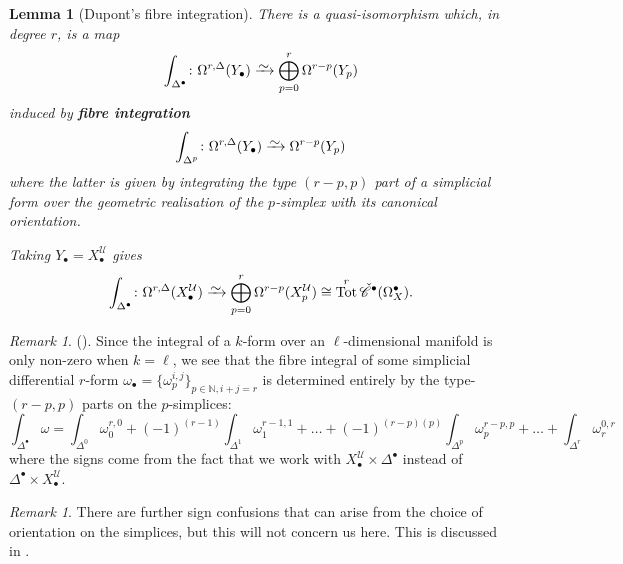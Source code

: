 \documentclass[11pt,fleqn]{article}
\theoremstyle{plain}
\newtheorem{lemma}[theorem]{Lemma}
\theoremstyle{definition}
\theoremstyle{remark}
\newtheorem{remark}[theorem]{Remark}
\numberwithin{equation}{theorem}
\newcommand{\cover}{\mathcal{U}}
\newcommand{\congto}{\xrightarrow{\raisebox{-.5ex}[0ex][0ex]{$\sim$}}}
\newcommand{\cech}{\check{\mathscr{C}}}
\newcommand{\define}[1]{\textbf{#1}}
\newcommand{\nerve}[1]{X_{#1}^\cover}
\DeclareMathOperator{\Tot}{Tot}
\begin{document}
        \begin{lemma}[Dupont's fibre integration]\label{lemma:dupont's-fibre-integration}
            There is a quasi-isomorphism which, in degree $r$, is a map
            \begin{equation}
                \int_{\Delta^\bullet}\colon \Omega^{r,\Delta}(Y_\bullet)
                \congto
                \bigoplus_{p=0}^r\Omega^{r-p}(Y_p)
            \end{equation}
            induced by \define{fibre integration}
            \begin{equation}
                \int_{\Delta^p}\colon\Omega^{r,\Delta}(Y_\bullet)
                \congto
                \Omega^{r-p}(Y_p)
            \end{equation}
            where the latter is given by integrating the type $(r-p,p)$ part of a simplicial form over the geometric realisation of the $p$-simplex with its canonical orientation.

            Taking $Y_\bullet=\nerve{\bullet}$ gives
            \[
                \int_{\Delta^\bullet}\colon \Omega^{r,\Delta}(\nerve{\bullet})
                \congto
                \bigoplus_{p=0}^r\Omega^{r-p}(\nerve{p})
                \cong
                \Tot^r\cech^\bullet(\Omega^\bullet_X).
            \]
        \end{lemma}

        \begin{remark}\label{remark:fibre-integration-only-depends-on-certain-parts}
            (\cite[p.~36]{Green1980}).
            Since the integral of a $k$-form over an $\ell$-dimensional manifold is only non-zero when $k=\ell$, we see that the fibre integral of some simplicial differential $r$-form $\omega_\bullet = \{\omega_p^{i,j}\}_{p\in\mathbb{N},i+j=r}$ is determined entirely by the type-$(r-p,p)$ parts on the $p$-simplices:
            \begin{equation*}
                \int_{\Delta^\bullet}\omega = \int_{\Delta^0}\omega_0^{r,0} + (-1)^{(r-1)}\int_{\Delta^1}\omega_1^{r-1,1} + \ldots + (-1)^{(r-p)(p)}\int_{\Delta^p}\omega_p^{r-p,p} + \ldots + \int_{\Delta^r}\omega_r^{0,r}
            \end{equation*}
            where the signs come from the fact that we work with $\nerve{\bullet}\times\Delta^\bullet$ instead of $\Delta^\bullet\times\nerve{\bullet}$.
        \end{remark}

        \begin{remark}
            There are further sign confusions that can arise from the choice of orientation on the simplices, but this will not concern us here.
            This is discussed in \cite{Hosgood2020}.
        \end{remark}
\end{document}
